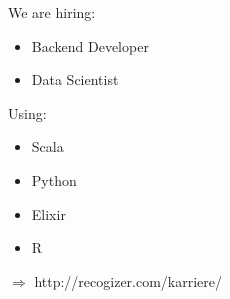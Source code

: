 \documentclass{beamer}
\begin{document}

{
\begin{frame}
\vspace{30 px}
We are hiring:
\begin{itemize}
\item Backend Developer
\item Data Scientist
\end{itemize}
Using:
\begin{itemize}
\item Scala
\item Python
\item Elixir
\item R
\end{itemize}
$\Rightarrow$ http://recogizer.com/karriere/
\end{frame}
}

\end{document}
